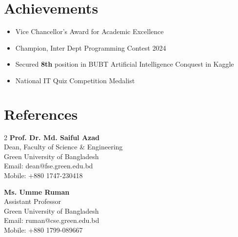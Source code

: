 \documentclass[letterpaper,11pt]{extarticle}
\begin{document}
\section{Achievements}
\begin{itemize}[noitemsep, topsep=0pt]
    \item Vice Chancellor's Award for Academic Excellence
    \vspace{0.2cm}
    \item Champion, Inter Dept Programming Contest 2024
    \vspace{0.2cm}
    \item Secured \textbf{8th} position in BUBT Artificial Intelligence Conquest in Kaggle
    \vspace{0.2cm}
    \item National IT Quiz Competition Medalist
\end{itemize}

\section{References}

\begin{multicols}{2}
\textbf{Prof. Dr. Md. Saiful Azad} \\
Dean, Faculty of Science \& Engineering \\
Green University of Bangladesh \\
Email: dean@fse.green.edu.bd \\
Mobile: +880 1747-230418

\columnbreak

\textbf{Ms. Umme Ruman} \\
Assistant Professor \\
Green University of Bangladesh \\
Email: ruman@cse.green.edu.bd \\
Mobile: +880 1799-089667
\end{multicols}
\end{document}
